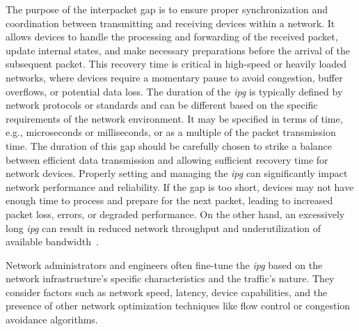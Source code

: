     The purpose of the interpacket gap is to ensure proper synchronization and coordination between transmitting and receiving devices within a network. It allows devices to handle the processing and forwarding of the received packet, update internal states, and make necessary preparations before the arrival of the subsequent packet. This recovery time is critical in high-speed or heavily loaded networks, where devices require a momentary pause to avoid congestion, buffer overflows, or potential data loss.
    The duration of the \textit{ipg} is typically defined by network protocols or standards and can be different based on the specific requirements of the network environment. It may be specified in terms of time, e.g., microseconds or milliseconds, or as a multiple of the packet transmission time. The duration of this gap should be carefully chosen to strike a balance between efficient data transmission and allowing sufficient recovery time for network devices. Properly setting and managing the \textit{ipg} can significantly impact network performance and reliability. If the gap is too short, devices may not have enough time to process and prepare for the next packet, leading to increased packet loss, errors, or degraded performance. On the other hand, an excessively long \textit{ipg} can result in reduced network throughput and underutilization of available bandwidth~\cite{askaripoor2023designer}.

    Network administrators and engineers often fine-tune the \textit{ipg} based on the network infrastructure's specific characteristics and the traffic's nature. They consider factors such as network speed, latency, device capabilities, and the presence of other network optimization techniques like flow control or congestion avoidance algorithms.



